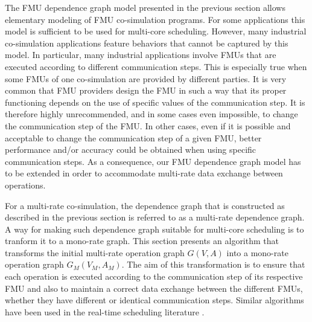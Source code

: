 The FMU dependence graph model presented in the previous section allows elementary modeling of FMU co-simulation programs. For some applications this model is sufficient to be used for multi-core scheduling. However, many industrial co-simulation applications feature behaviors that cannot be captured by this model. In particular, many industrial applications involve FMUs that are executed according to different communication steps. This is especially true when some FMUs of one co-simulation are provided by different parties. It is very common that FMU providers design the FMU in such a way that its proper functioning depends on the use of specific values of the communication step. It is therefore highly unrecommended, and in some cases even impossible, to change the communication step of the FMU. In other cases, even if it is possible and acceptable to change the communication step of a given FMU, better performance and/or accuracy could be obtained when using specific communication steps. As a consequence, our FMU dependence graph model has to be extended in order to accommodate multi-rate data exchange between operations. 

For a multi-rate co-simulation, the dependence graph that is constructed as described in the previous section is referred to as a multi-rate dependence graph. A way for making such dependence graph suitable for multi-core scheduling is to tranform it to a mono-rate graph. This section presents an algorithm that transforms the initial multi-rate operation graph $G(V,A)$ into a mono-rate operation graph $G_M(V_M,A_M)$. The aim of this transformation is to ensure that each operation is executed according to the communication step of its respective FMU and also to maintain a correct data exchange between the different FMUs, whether they have different or identical communication steps. Similar algorithms have been used in the real-time scheduling literature \cite{kermia:2009, ramamritham:1995}.

